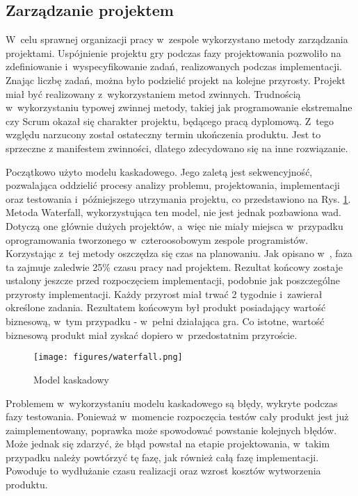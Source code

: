 \subsection{Zarządzanie projektem}
W~celu sprawnej organizacji pracy w~zespole wykorzystano metody zarządzania projektami. Uspójnienie projektu gry podczas fazy projektowania pozwoliło na zdefiniowanie i~wyspecyfikowanie zadań, realizowanych podczas implementacji. Znając liczbę zadań, można było podzielić projekt na kolejne przyrosty. Projekt miał być realizowany z~wykorzystaniem metod zwinnych. Trudnością w~wykorzystaniu typowej zwinnej metody, takiej jak programowanie ekstremalne czy Scrum okazał się charakter projektu, będącego pracą dyplomową. Z~tego względu narzucony został ostateczny termin ukończenia produktu. Jest to sprzeczne z manifestem zwinności, dlatego zdecydowano się na inne rozwiązanie.

Początkowo użyto modelu kaskadowego. Jego zaletą jest sekwencyjność, pozwalająca oddzielić procesy analizy problemu, projektowania, implementacji oraz testowania i~późniejszego utrzymania projektu, co przedstawiono na Rys. \ref{waterfall}. Metoda Waterfall, wykorzystująca ten model, nie jest jednak pozbawiona wad. Dotyczą one głównie dużych projektów, a~więc nie miały miejsca w~przypadku oprogramowania tworzonego w~czteroosobowym zespole programistów. Korzystając z~tej metody oszczędza się czas na planowaniu. Jak opisano w~\cite{Kaczor:Scrum}, faza ta zajmuje zaledwie 25\% czasu pracy nad projektem. Rezultat końcowy zostaje ustalony jeszcze przed rozpoczęciem implementacji, podobnie jak poszczególne przyrosty implementacji. Każdy przyrost miał trwać 2 tygodnie i~zawierał określone zadania. Rezultatem końcowym był produkt posiadający wartość biznesową, w~tym przypadku - w~pełni działająca gra. Co istotne, wartość biznesową produkt miał zyskać dopiero w~przedostatnim przyroście. 

\begin{figure}
\begin{center}
\texttt{[image: figures/waterfall.png]}
\caption{Model kaskadowy}
\label{waterfall}
\end{center}
\end{figure}

Problemem w~wykorzystaniu modelu kaskadowego są błędy, wykryte podczas fazy testowania. Ponieważ w~momencie rozpoczęcia testów cały produkt jest już zaimplementowany, poprawka może spowodować powstanie kolejnych błędów. Może jednak się zdarzyć, że błąd powstał na etapie projektowania, w~takim przypadku należy powtórzyć tę fazę, jak również całą fazę implementacji. Powoduje to wydłużanie czasu realizacji oraz wzrost kosztów wytworzenia produktu.

